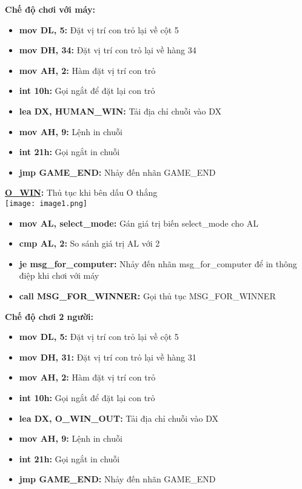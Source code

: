 \textbf{Chế độ chơi với máy:}
\begin{itemize}
    \item \textbf{mov DL, 5:} Đặt vị trí con trỏ lại về cột 5 
    \item \textbf{mov DH, 34:} Đặt vị trí con trỏ lại về hàng 34
    \item \textbf{mov AH, 2:} Hàm đặt vị trí con trỏ
    \item \textbf{int 10h:} Gọi ngắt để đặt lại con trỏ
    \item \textbf{lea DX, HUMAN\_WIN: }Tải địa chỉ chuỗi vào DX
    \item \textbf{mov AH, 9:} Lệnh in chuỗi
    \item \textbf{int 21h: }Gọi ngắt in chuỗi
    \item \textbf{jmp GAME\_END: }Nhảy đến nhãn GAME\_END
\end{itemize}
\textbf{\underline{O\_WIN}: }Thủ tục khi bên dấu O thắng\\
\texttt{[image: image1.png]}
\begin{itemize}
    \item \textbf{mov AL, select\_mode:} Gán giá trị biến select\_mode cho AL
    \item \textbf{cmp AL, 2:} So sánh giá trị AL với 2
    \item \textbf{je msg\_for\_computer:} Nhảy đến nhãn msg\_for\_computer để in thông điệp khi chơi với máy
    \item \textbf{call MSG\_FOR\_WINNER:} Gọi thủ tục MSG\_FOR\_WINNER
\end{itemize}

\textbf{Chế độ chơi 2 người:}
\begin{itemize}
    \item \textbf{mov DL, 5:} Đặt vị trí con trỏ lại về cột 5 
    \item \textbf{mov DH, 31:} Đặt vị trí con trỏ lại về hàng 31
    \item \textbf{mov AH, 2:} Hàm đặt vị trí con trỏ
    \item \textbf{int 10h:} Gọi ngắt để đặt lại con trỏ
    \item \textbf{lea DX, O\_WIN\_OUT:} Tải địa chỉ chuỗi vào DX
    \item \textbf{mov AH, 9:} Lệnh in chuỗi
    \item \textbf{int 21h:} Gọi ngắt in chuỗi
    \item \textbf{jmp GAME\_END:} Nhảy đến nhãn GAME\_END
\end{itemize}

